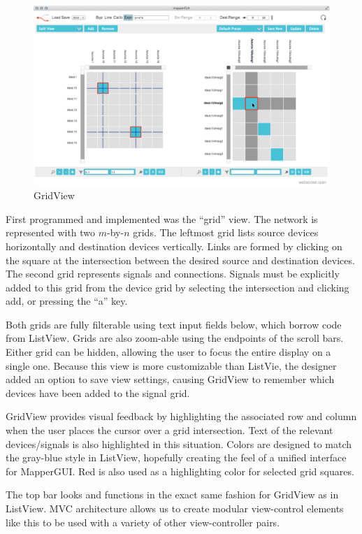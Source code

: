\begin{figure}[ht]
\centering
	\includegraphics[width=\textwidth]{figures/grid_w_cursor}
\caption{GridView}
\label{fig:grid}
\end{figure}

First programmed and implemented was the ``grid'' view. The network is represented with two $m$-by-$n$ grids. The leftmost grid lists source devices horizontally and destination devices vertically. Links are formed by clicking on the square at the intersection between the desired source and destination devices. The second grid represents signals and connections. Signals must be explicitly added to this grid from the device grid by selecting the intersection and clicking add, or pressing the ``a'' key. 

Both grids are fully filterable using text input fields below, which borrow code from ListView. Grids are also zoom-able using the endpoints of the scroll bars. Either grid can be hidden, allowing the user to focus the entire display on a single one. Because this view is more customizable than ListVie, the designer added an option to save view settings, causing GridView to remember which devices have been added to the signal grid.

GridView provides visual feedback by highlighting the associated row and column when the user places the cursor over a grid intersection. Text of the relevant devices/signals is also highlighted in this situation. Colors are designed to match the gray-blue style in ListView, hopefully creating the feel of a unified interface for MapperGUI. Red is also used as a highlighting color for selected grid squares.

The top bar looks and functions in the exact same fashion for GridView as in ListView. MVC architecture allows us to create modular view-control elements like this to be used with a variety of other view-controller pairs.

